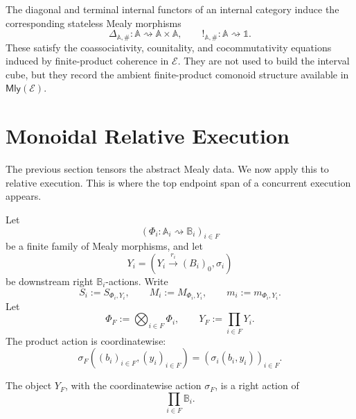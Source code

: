 \begin{remark}
\label{rem:cmett-diagonal-terminal-data}
    The diagonal and terminal internal functors of an internal category induce
    the corresponding stateless Mealy morphisms
    \[
        \Delta_{\mathbb A,\#}:\mathbb A\rightsquigarrow\mathbb A\times\mathbb A,
        \qquad
        !_{\mathbb A,\#}:\mathbb A\rightsquigarrow\mathbb 1.
    \]
    These satisfy the coassociativity, counitality, and cocommutativity
    equations induced by finite-product coherence in \(\mathcal E\). They are
    not used to build the interval cube, but they record the ambient
    finite-product comonoid structure available in \(\mathsf{Mly}(\mathcal E)\).
\end{remark}

\section{Monoidal Relative Execution}
\label{sec:cmett-monoidal-relative-execution}

The previous section tensors the abstract Mealy data. We now apply this to
relative execution. This is where the top endpoint span of a concurrent
execution appears.

Let
\[
    (\Phi_i:\mathbb A_i\rightsquigarrow\mathbb B_i)_{i\in F}
\]
be a finite family of Mealy morphisms, and let
\[
    Y_i=(Y_i\xrightarrow{r_i}(B_i)_0,\sigma_i)
\]
be downstream right \(\mathbb B_i\)-actions. Write
\[
    S_i:=S_{\Phi_i,Y_i},
    \qquad
    M_i:=M_{\Phi_i,Y_i},
    \qquad
    m_i:=m_{\Phi_i,Y_i}.
\]
Let
\[
    \Phi_F:=\bigotimes_{i\in F}\Phi_i,
    \qquad
    Y_F:=\prod_{i\in F}Y_i.
\]
The product action is coordinatewise:
\[
    \sigma_F((b_i)_{i\in F},(y_i)_{i\in F})
    =
    (\sigma_i(b_i,y_i))_{i\in F}.
\]

\begin{lemma}
\label{lem:cmett-product-downstream-actions}
    The object \(Y_F\), with the coordinatewise action \(\sigma_F\), is a
    right action of
    \[
        \prod_{i\in F}\mathbb B_i.
    \]
\end{lemma}

